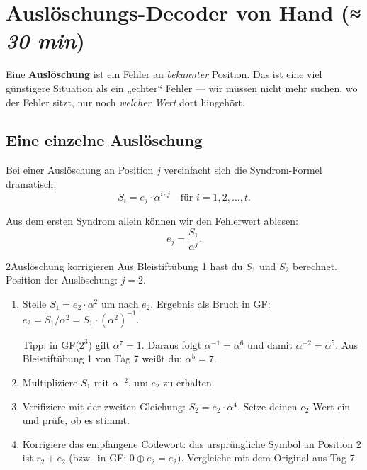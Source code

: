 \section{Auslöschungs-Decoder von Hand \normalfont(\textit{≈ 30 min})}

Eine \textbf{Auslöschung} ist ein Fehler an \emph{bekannter} Position.
Das ist eine viel günstigere Situation als ein „echter“ Fehler — wir
müssen nicht mehr suchen, wo der Fehler sitzt, nur noch \emph{welcher
Wert} dort hingehört.

\subsection*{Eine einzelne Auslöschung}

Bei einer Auslöschung an Position $j$ vereinfacht sich die
Syndrom-Formel dramatisch:
\[
  S_i = e_j \cdot \alpha^{i \cdot j} \quad \text{für } i = 1, 2, \dots, t.
\]

Aus dem ersten Syndrom allein können wir den Fehlerwert ablesen:
\[
  e_j = \frac{S_1}{\alpha^j}.
\]

\begin{bleistiftuebung}{2}{Auslöschung korrigieren}
Aus Bleistiftübung 1 hast du $S_1$ und $S_2$ berechnet. Position der
Auslöschung: $j = 2$.

\begin{enumerate}[label=(\alph*), leftmargin=*]
\item Stelle $S_1 = e_2 \cdot \alpha^2$ um nach $e_2$.
  Ergebnis als Bruch in GF: $e_2 = S_1 / \alpha^2 = S_1 \cdot
  (\alpha^2)^{-1}$.

  Tipp: in GF($2^3$) gilt $\alpha^7 = 1$. Daraus folgt
  $\alpha^{-1} = \alpha^6$ und damit $\alpha^{-2} = \alpha^5$.
  Aus Bleistiftübung 1 von Tag 7 weißt du: $\alpha^5 = 7$.

\item Multipliziere $S_1$ mit $\alpha^{-2}$, um $e_2$ zu erhalten.

\item Verifiziere mit der zweiten Gleichung: $S_2 = e_2 \cdot
  \alpha^4$. Setze deinen $e_2$-Wert ein und prüfe, ob es stimmt.

\item Korrigiere das empfangene Codewort: das ursprüngliche Symbol
  an Position 2 ist $r_2 + e_2$ (bzw.\ in GF: $0 \oplus e_2 = e_2$).
  Vergleiche mit dem Original aus Tag 7.
\end{enumerate}
\end{bleistiftuebung}

